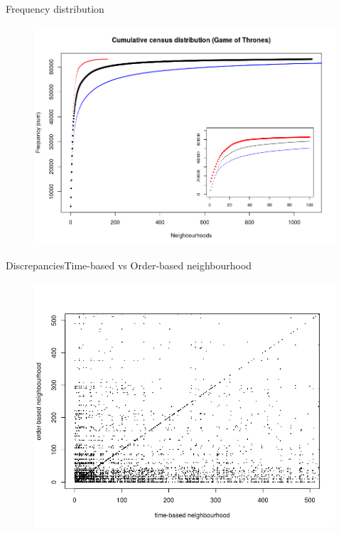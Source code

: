 \documentclass{beamer}
\begin{document}
\begin{frame}{Frequency distribution}{}
	\begin{figure}
		\centering
		\includegraphics[width=1\textwidth]{compare_census_distribution_cum}
	\end{figure}
\end{frame}

\begin{frame}{Discrepancies}{Time-based vs Order-based neighbourhood}
	\begin{figure}
		\centering
		\includegraphics[width=1\textwidth]{confusion_time_order}
	\end{figure}
\end{frame}
\end{document}
